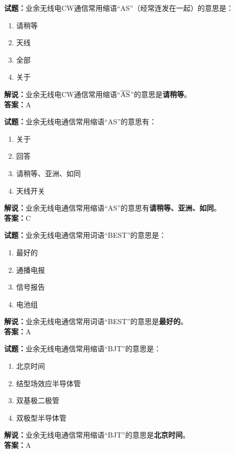 \documentclass{ctexbook}
\begin{document}
\bigskip


\noindent\textbf{试题：}业余无线电CW通信常用缩语“AS”（经常连发在一起）的意思是：
\begin{enumerate}[leftmargin=3em]
\item 请稍等
\item 天线
\item 全部
\item 关于
\end{enumerate}
\noindent\textbf{解说：}业余无线电CW通信常用缩语“$\overline{\rm AS}$”的意思是\textbf{请稍等}。\\\noindent\textbf{答案：}A

\bigskip


\noindent\textbf{试题：}业余无线电通信常用缩语“AS”的意思有：
\begin{enumerate}[leftmargin=3em]
\item 关于
\item 回答
\item 请稍等、亚洲、如同
\item 天线开关
\end{enumerate}
\noindent\textbf{解说：}业余无线电通信常用缩语“AS”的意思有\textbf{请稍等、亚洲、如同}。\\\noindent\textbf{答案：}C

\bigskip


\noindent\textbf{试题：}业余无线电通信常用词语“BEST”的意思是：
\begin{enumerate}[leftmargin=3em]
\item 最好的
\item 通播电报
\item 信号报告
\item 电池组
\end{enumerate}
\noindent\textbf{解说：}业余无线电通信常用词语“BEST”的意思是\textbf{最好的}。\\\noindent\textbf{答案：}A

\bigskip


\noindent\textbf{试题：}业余无线电通信常用缩语“BJT”的意思是：
\begin{enumerate}[leftmargin=3em]
\item 北京时间
\item 结型场效应半导体管
\item 双基极二极管
\item 双极型半导体管
\end{enumerate}
\noindent\textbf{解说：}业余无线电通信常用缩语“BJT”的意思是\textbf{北京时间}。\\\noindent\textbf{答案：}A
\end{document}
